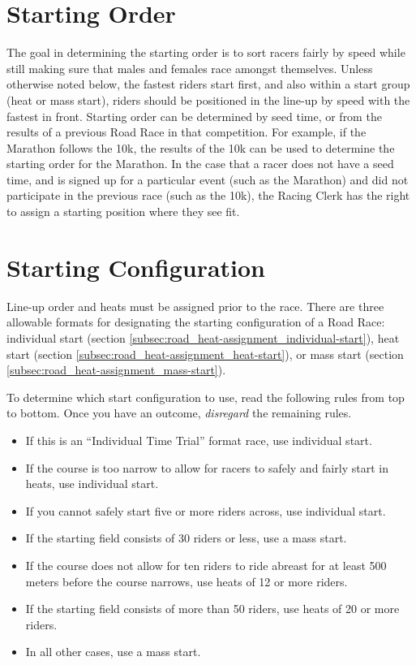 \section{Starting Order}

The goal in determining the starting order is to sort racers fairly by speed while still making sure that males and females race amongst themselves.
Unless otherwise noted below, the fastest riders start first, and also within a start group (heat or mass start), riders should be positioned in the line-up by speed with the fastest in front.
Starting order can be determined by seed time, or from the results of a previous Road Race in that competition.
For example, if the Marathon follows the 10k, the results of the 10k can be used to determine the starting order for the Marathon.
In the case that a racer does not have a seed time, and is signed up for a particular event (such as the Marathon) and did not participate in the previous race (such as the 10k), the Racing Clerk has the right to assign a starting position where they see fit.

\section{Starting Configuration}

Line-up order and heats must be assigned prior to the race.
There are three allowable formats for designating the starting configuration of a Road Race: individual start (section \ref{subsec:road_heat-assignment_individual-start}), heat start (section \ref{subsec:road_heat-assignment_heat-start}), or mass start (section \ref{subsec:road_heat-assignment_mass-start}).

To determine which start configuration to use, read the following rules from top to bottom.
Once you have an outcome, \emph{disregard} the remaining rules.
\begin{itemize}
\item If this is an ``Individual Time Trial'' format race, use individual start.
\item If the course is too narrow to allow for racers to safely and fairly start in heats, use individual start.
\item If you cannot safely start five or more riders across, use individual start.
\item If the starting field consists of 30 riders or less, use a mass start.
\item If the course does not allow for ten riders to ride abreast for at least 500 meters before the course narrows, use heats of 12 or more riders.
\item If the starting field consists of more than 50 riders, use heats of 20 or more riders.
\item In all other cases, use a mass start.
\end{itemize}

